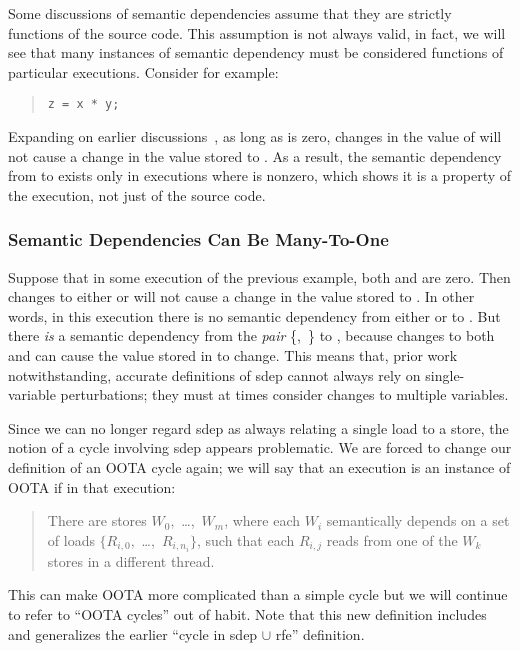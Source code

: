 Some discussions of semantic dependencies assume that they
are strictly functions of the source code.
This assumption is not always valid, in fact, we will see that many
instances of semantic dependency must be considered functions of
particular executions.
Consider for example:
\begin{quote}
\begin{verbatim}
z = x * y;
\end{verbatim}
\end{quote}

Expanding on earlier discussions~\cite{Boehm:2014:OGA:2618128.2618134},
as long as  is zero, changes in the
value of  will not cause a change in the value stored to .
As a result, the semantic dependency from  to  exists only
in executions where  is nonzero,
which shows it is a property of the execution, not just of the source code.

\subsubsection{Semantic Dependencies Can Be Many-To-One}
\label{sec:Semantic Dependencies Can Be Many-To-One}

Suppose that in some execution of the previous example,
both  and  are zero.
Then changes to either  or 
will not cause a change in the value stored to .
In other words, in this execution there is no semantic dependency
from either  or  to .
But there \emph{is} a semantic dependency from the \emph{pair}
\{,~\} to ,
because changes to both  and 
can cause the value stored in  to change.
This means that, prior work~\cite{PaulEMcKenney2016OOTA}
notwithstanding, accurate definitions of sdep cannot always rely on
single-variable perturbations;
they must at times consider changes to multiple variables.

Since we can no longer regard sdep as always relating a single load to a store,
the notion of a cycle involving sdep appears problematic.
We are forced to change our definition of an OOTA cycle again;
we will say that an execution is an instance of OOTA if in that execution:
\begin{quote}
	There are stores $W_0,$ \ldots,~$W_m$,
	where each $W_i$ semantically depends on a set of loads
	$\{R_{i,0},$ \ldots,~$R_{i,n_i}\}$,
	such that each $R_{i,j}$ reads from one of the $W_k$
	stores in a different thread.
\end{quote}
This can make OOTA more complicated than a simple cycle but
we will continue to refer to ``OOTA cycles'' out of habit.
Note that this new definition includes and generalizes the earlier
``cycle in sdep $\cup$ rfe'' definition.

